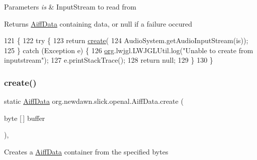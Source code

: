 \begin{DoxyParams}{Parameters}
{\em is} & Input\+Stream to read from \\
\hline
\end{DoxyParams}
\begin{DoxyReturn}{Returns}
\mbox{\hyperlink{classorg_1_1newdawn_1_1slick_1_1openal_1_1_aiff_data}{Aiff\+Data}} containing data, or null if a failure occured 
\end{DoxyReturn}

\begin{DoxyCode}
121                                                   \{
122         \textcolor{keywordflow}{try} \{
123             \textcolor{keywordflow}{return} \mbox{\hyperlink{classorg_1_1newdawn_1_1slick_1_1openal_1_1_aiff_data_a0ebd8831d179c446e18751819f9045c5}{create}}(
124                 AudioSystem.getAudioInputStream(is));
125         \} \textcolor{keywordflow}{catch} (Exception e) \{
126             \mbox{\hyperlink{namespaceorg}{org}}.lwjgl.LWJGLUtil.log(\textcolor{stringliteral}{"Unable to create from inputstream"});
127             e.printStackTrace();
128             \textcolor{keywordflow}{return} null;
129         \}       
130     \}   
\end{DoxyCode}
\mbox{\label{classorg_1_1newdawn_1_1slick_1_1openal_1_1_aiff_data_a930e114892ff2c908c7e98fa549dfe76}} 
\subsubsection{\texorpdfstring{create()}{create()}\hspace{0.1cm}{\footnotesize\ttfamily [4/6]}}
{\footnotesize\ttfamily static \mbox{\hyperlink{classorg_1_1newdawn_1_1slick_1_1openal_1_1_aiff_data}{Aiff\+Data}} org.\+newdawn.\+slick.\+openal.\+Aiff\+Data.\+create (\begin{DoxyParamCaption}\item[{byte \mbox{[}$\,$\mbox{]}}]{buffer }\end{DoxyParamCaption})\hspace{0.3cm}{\ttfamily [inline]}, {\ttfamily [static]}}

Creates a \mbox{\hyperlink{classorg_1_1newdawn_1_1slick_1_1openal_1_1_aiff_data}{Aiff\+Data}} container from the specified bytes


